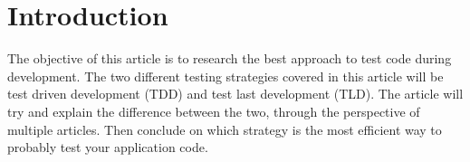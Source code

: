 \section{Introduction}
\label{section:intro}



The objective of this article is to research the best approach to test code during development. 
The two different testing strategies covered in this article will be test driven development (TDD) and test last development (TLD). 
The article will try and explain the difference between the two, through the perspective of multiple articles. 
Then conclude on which strategy is the most efficient way to probably test your application code.  



